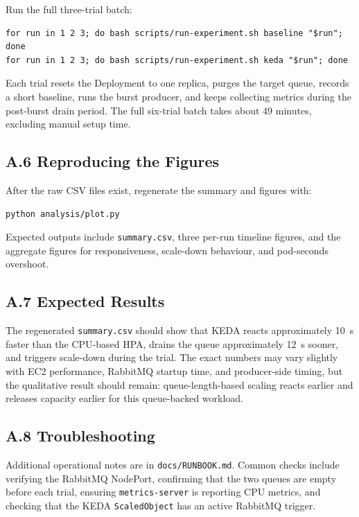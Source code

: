 Run the full three-trial batch:
\begin{verbatim}
for run in 1 2 3; do bash scripts/run-experiment.sh baseline "$run"; done
for run in 1 2 3; do bash scripts/run-experiment.sh keda "$run"; done
\end{verbatim}

Each trial resets the Deployment to one replica, purges the target queue, records a short baseline, runs the burst producer, and keeps collecting metrics during the post-burst drain period. The full six-trial batch takes about 49 minutes, excluding manual setup time.

\subsection*{A.6 Reproducing the Figures}
After the raw CSV files exist, regenerate the summary and figures with:
\begin{verbatim}
python analysis/plot.py
\end{verbatim}
Expected outputs include \texttt{summary.csv}, three per-run timeline figures, and the aggregate figures for responsiveness, scale-down behaviour, and pod-seconds overshoot.

\subsection*{A.7 Expected Results}
The regenerated \texttt{summary.csv} should show that KEDA reacts approximately 10~s faster than the CPU-based HPA, drains the queue approximately 12~s sooner, and triggers scale-down during the trial. The exact numbers may vary slightly with EC2 performance, RabbitMQ startup time, and producer-side timing, but the qualitative result should remain: queue-length-based scaling reacts earlier and releases capacity earlier for this queue-backed workload.

\subsection*{A.8 Troubleshooting}
Additional operational notes are in \texttt{docs/RUNBOOK.md}. Common checks include verifying the RabbitMQ NodePort, confirming that the two queues are empty before each trial, ensuring \texttt{metrics-server} is reporting CPU metrics, and checking that the KEDA \texttt{ScaledObject} has an active RabbitMQ trigger.
